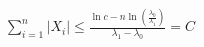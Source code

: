 \documentclass[preview]{standalone}
\begin{document}
\begin{align*}
\sum_{i=1}^n |X_i| \leq \frac{\ln c - n\ln\left(\frac{\lambda_0}{\lambda_1}\right)}{\lambda_1-\lambda_0} = C
\end{align*}
\end{document}
